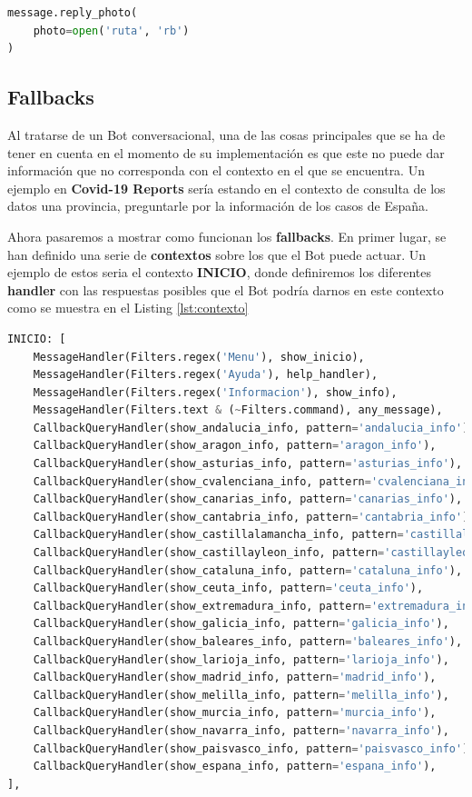\begin{lstlisting}[language=Python, caption={Función que devuelve una imagen en el chat.}, label={lst:def-funcion-imagen}]
message.reply_photo(
	photo=open('ruta', 'rb')
)
\end{lstlisting}

\subsection{Fallbacks}

Al tratarse de un Bot conversacional, una de las cosas principales que se ha de tener en cuenta en el momento de su implementación es que este no puede dar información que no corresponda con el contexto en el que se encuentra. Un ejemplo en \textbf{Covid-19 Reports} sería estando en el contexto de consulta de los datos una provincia, preguntarle por la información de los casos de España.

Ahora pasaremos a mostrar como funcionan los \textbf{fallbacks}. En primer lugar, se han definido una serie de \textbf{contextos} sobre los que el Bot puede actuar. Un ejemplo de estos seria el contexto \textbf{INICIO}, donde definiremos los diferentes \textbf{handler} con las respuestas posibles que el Bot podría darnos en este contexto como se muestra en el Listing \ref{lst:contexto}

\begin{lstlisting}[language=Python, caption={Lista de handlers asociado al conexto INICIO.}, label={lst:contexto}]
INICIO: [
	MessageHandler(Filters.regex('Menu'), show_inicio),
	MessageHandler(Filters.regex('Ayuda'), help_handler),
	MessageHandler(Filters.regex('Informacion'), show_info),
	MessageHandler(Filters.text & (~Filters.command), any_message),
	CallbackQueryHandler(show_andalucia_info, pattern='andalucia_info'),
	CallbackQueryHandler(show_aragon_info, pattern='aragon_info'),
	CallbackQueryHandler(show_asturias_info, pattern='asturias_info'),
	CallbackQueryHandler(show_cvalenciana_info, pattern='cvalenciana_info'),
	CallbackQueryHandler(show_canarias_info, pattern='canarias_info'),
	CallbackQueryHandler(show_cantabria_info, pattern='cantabria_info'),
	CallbackQueryHandler(show_castillalamancha_info, pattern='castillalamancha_info'),
	CallbackQueryHandler(show_castillayleon_info, pattern='castillayleon_info'),
	CallbackQueryHandler(show_cataluna_info, pattern='cataluna_info'),
	CallbackQueryHandler(show_ceuta_info, pattern='ceuta_info'),
	CallbackQueryHandler(show_extremadura_info, pattern='extremadura_info'),
	CallbackQueryHandler(show_galicia_info, pattern='galicia_info'),
	CallbackQueryHandler(show_baleares_info, pattern='baleares_info'),
	CallbackQueryHandler(show_larioja_info, pattern='larioja_info'),
	CallbackQueryHandler(show_madrid_info, pattern='madrid_info'),
	CallbackQueryHandler(show_melilla_info, pattern='melilla_info'),
	CallbackQueryHandler(show_murcia_info, pattern='murcia_info'),
	CallbackQueryHandler(show_navarra_info, pattern='navarra_info'),
	CallbackQueryHandler(show_paisvasco_info, pattern='paisvasco_info'),
	CallbackQueryHandler(show_espana_info, pattern='espana_info'),
],
\end{lstlisting}

